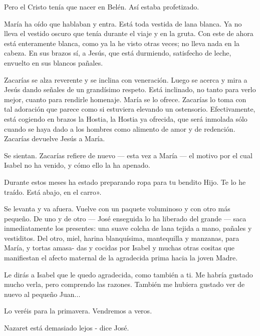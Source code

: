 \documentclass[12pt]{book} %
\begin{document}
Pero el Cristo tenía que nacer en Belén. Así estaba profetizado. 

María ha oído que hablaban y entra. Está toda vestida de lana blanca. Ya no lleva el vestido oscuro que tenía durante el viaje y en la gruta. Con este de ahora está enteramente blanca, como ya la he visto otras veces; no lleva nada en la cabeza. En sus brazos sí, a Jesús, que está durmiendo, satisfecho de leche, envuelto en sus blancos pañales. 

Zacarías se alza reverente y se inclina con veneración. Luego se acerca y mira a Jesús dando señales de un grandísimo respeto. Está inclinado, no tanto para verlo mejor, cuanto para rendirle homenaje. María se lo ofrece. Zacarías lo toma con tal adoración que parece como si estuviera elevando un ostensorio. Efectivamente, está cogiendo en brazos la Hostia, la Hostia ya ofrecida, que será inmolada sólo cuando se haya dado a los hombres como alimento de amor y de redención. Zacarías devuelve Jesús a María. 

Se sientan. Zacarías refiere de nuevo — esta vez a María — el motivo por el cual Isabel no ha venido, y cómo ello la ha apenado. 

Durante estos meses ha estado preparando ropa para tu bendito Hijo. Te lo he traído. Está abajo, en el carro». 

Se levanta y va afuera. Vuelve con un paquete voluminoso y con otro más pequeño. De uno y de otro — José enseguida lo ha liberado del grande — saca inmediatamente los presentes: una suave colcha de lana tejida a mano, pañales y vestiditos. Del otro, miel, harina blanquísima, mantequilla y manzanas, para María, y tortas amasa- das y cocidas por Isabel y muchas otras cositas que manifiestan el afecto maternal de la agradecida prima hacia la joven Madre. 

Le dirás a Isabel que le quedo agradecida, como también a ti. Me habría gustado mucho verla, pero comprendo las razones. También me hubiera gustado ver de nuevo al pequeño Juan... 

Lo veréis para la primavera. Vendremos a veros. 

Nazaret está demasiado lejos - dice José. 
\end{document}
